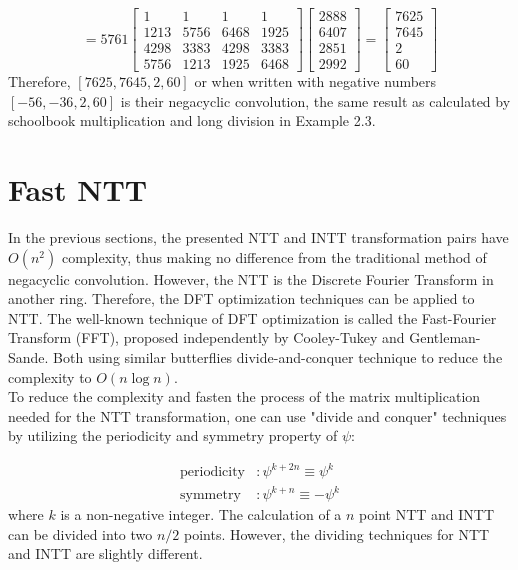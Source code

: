 \documentclass[12pt]{report}
\begin{document}
\[
= 5761
\begin{bmatrix}
1 & 1 & 1 & 1 \\
1213 & 5756 & 6468 & 1925 \\
4298 & 3383 & 4298 & 3383 \\
5756 & 1213 & 1925 & 6468
\end{bmatrix}
\begin{bmatrix}
2888 \\
6407 \\
2851 \\
2992
\end{bmatrix} =
\begin{bmatrix}
7625 \\
7645 \\
2 \\
60
\end{bmatrix}
\]
Therefore, $[7625,7645,2,60]$ or when written with negative numbers $[-56,-36,2,60]$ is their negacyclic convolution, the same result as calculated by schoolbook multiplication and long division in Example 2.3.

\section{Fast NTT}

In the previous sections, the presented NTT and INTT transformation pairs have $O(n^2)$ complexity, thus making no difference from the traditional method of negacyclic convolution. However, the NTT is the Discrete Fourier Transform in another ring. Therefore, the DFT optimization techniques can be applied to NTT. The well-known technique of DFT optimization is called the Fast-Fourier Transform (FFT), proposed independently by Cooley-Tukey and Gentleman-Sande. Both using similar butterflies divide-and-conquer technique to reduce the complexity to $O(n \log n)$.\\
To reduce the complexity and fasten the process of the matrix multiplication needed for the NTT transformation, one can use "divide and conquer" techniques by utilizing the periodicity and symmetry property of $\psi$:

\begin{align}
\text{periodicity} &: \psi^{k+2n} \equiv \psi^{k} \label{eq:periodicity} \\
\text{symmetry} &: \psi^{k+n} \equiv -\psi^{k} \label{eq:symmetry}
\end{align}
where $k$ is a non-negative integer. The calculation of a $n$ point NTT and INTT can be divided into two $n/2$ points. However, the dividing techniques for NTT and INTT are slightly different.
\end{document}
